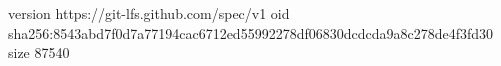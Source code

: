 version https://git-lfs.github.com/spec/v1
oid sha256:8543abd7f0d7a77194cac6712ed55992278df06830dcdcda9a8c278de4f3fd30
size 87540
